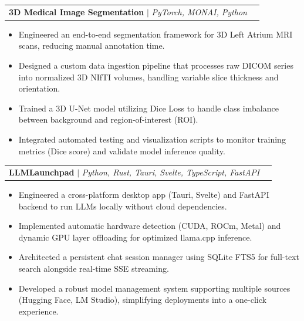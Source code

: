 \documentclass[letterpaper,11pt]{article}
\makeatletter
\newcommand{\resumeItem}[1]{
  \item\small{
    {#1 \vspace{-2pt}}
  }
}
\newcommand{\resumeProjectHeading}[2]{
    \item
    \begin{tabular*}{\textwidth}{l@{\extracolsep{\fill}}r}
      \small#1 & #2 \\
    \end{tabular*}\vspace{-7pt}
}
\newcommand{\resumeItemListStart}{\begin{itemize}[leftmargin=0.15in]}
\newcommand{\resumeItemListEnd}{\end{itemize}\vspace{-5pt}}
\makeatother
\begin{document}
\resumeProjectHeading
{\textbf{3D Medical Image Segmentation} $|$ \emph{PyTorch, MONAI, Python}}{}
\resumeItemListStart
\resumeItem{Engineered an end-to-end segmentation framework for 3D Left Atrium MRI scans, reducing manual annotation time.}
\resumeItem{Designed a custom data ingestion pipeline that processes raw DICOM series into normalized 3D NIfTI volumes, handling variable slice thickness and orientation.}
\resumeItem{Trained a 3D U-Net model utilizing Dice Loss to handle class imbalance between background and region-of-interest (ROI).}
\resumeItem{Integrated automated testing and visualization scripts to monitor training metrics (Dice score) and validate model inference quality.}
\resumeItemListEnd

\resumeProjectHeading
{\textbf{LLMLaunchpad} $|$ \emph{Python, Rust, Tauri, Svelte, TypeScript, FastAPI}}{}
\resumeItemListStart
\resumeItem{Engineered a cross-platform desktop app (Tauri, Svelte) and FastAPI backend to run LLMs locally without cloud dependencies.}
\resumeItem{Implemented automatic hardware detection (CUDA, ROCm, Metal) and dynamic GPU layer offloading for optimized llama.cpp inference.}
\resumeItem{Architected a persistent chat session manager using SQLite FTS5 for full-text search alongside real-time SSE streaming.}
\resumeItem{Developed a robust model management system supporting multiple sources (Hugging Face, LM Studio), simplifying deployments into a one-click experience.}
\resumeItemListEnd


\end{document}
